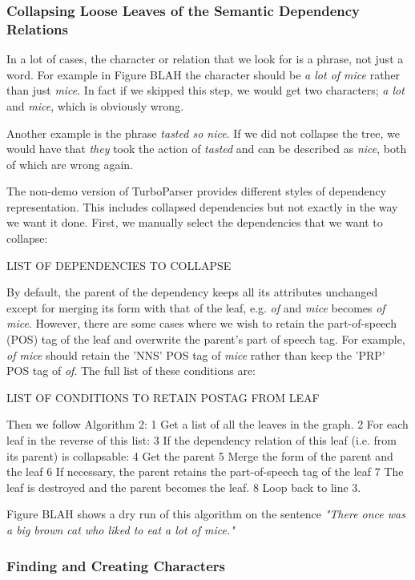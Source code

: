 \subsubsection{Collapsing Loose Leaves of the Semantic Dependency Relations}
\label{sec:collapse}

In a lot of cases, the character or relation that we look for is a phrase, not just a word. For example in Figure BLAH the character should be \textit{a lot of mice} rather than just \textit{mice}. In fact if we skipped this step, we would get two characters; \textit{a lot} and \textit{mice}, which is obviously wrong.

Another example is the phrase \textit{tasted so nice}. If we did not collapse the tree, we would have that \textit{they} took the action of \textit{tasted} and can be described as \textit{nice}, both of which are wrong again.

The non-demo version of TurboParser provides different styles of dependency representation. This includes collapsed dependencies but not exactly in the way we want it done. First, we manually select the dependencies that we want to collapse:

LIST OF DEPENDENCIES TO COLLAPSE

By default, the parent of the dependency keeps all its attributes unchanged except for merging its form with that of the leaf, e.g. \textit{of} and \textit{mice} becomes \textit{of mice}. However, there are some cases where we wish to retain the part-of-speech (POS) tag of the leaf and overwrite the parent's part of speech tag. For example, \textit{of mice} should retain the 'NNS' POS tag of \textit{mice} rather than keep the 'PRP' POS tag of \textit{of}. The full list of these conditions are:

LIST OF CONDITIONS TO RETAIN POSTAG FROM LEAF

Then we follow Algorithm 2:
1 Get a list of all the leaves in the graph.
2 For each leaf in the reverse of this list:
3	If the dependency relation of this leaf (i.e. from its parent) is collapsable:
4		Get the parent
5		Merge the form of the parent and the leaf
6		If necessary, the parent retains the part-of-speech tag of the leaf
7		The leaf is destroyed and the parent becomes the leaf.
8		Loop back to line 3.

Figure BLAH shows a dry run of this algorithm on the sentence \textit{"There once was a big brown cat who liked to eat a lot of mice."}

\subsubsection{Finding and Creating Characters}
\label{sec:characters} 

